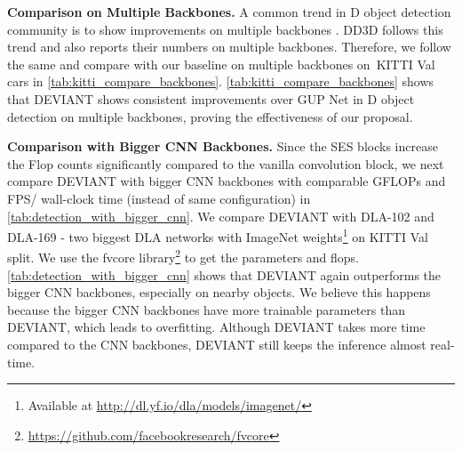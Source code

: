 \documentclass[runningheads]{llncs}
\newcommand{\twoD}{D}
\newcommand{\threeD}{D}
\newcommand{\dlaOneZeroTwo}{DLA-102}
\newcommand{\dlaOneSixNine}{DLA-169}
\newcommand{\kitti}{KITTI}
\newcommand{\imageNet}{ImageNet}
\newcommand{\valOne}{Val}
\newcommand{\gupNet}{GUP Net}
\newcommand{\ddThreeD}{DD3D}
\newcommand{\noIndentHeading}[1]{\noindent\textbf{#1}}
\newcommand{\methodName}{DEVIANT}
\begin{document}
\noIndentHeading{Comparison on Multiple Backbones.}
            A common trend in \twoD{} object detection community is to show improvements on multiple backbones \cite{wang2020scale}. 
            \ddThreeD \cite{park2021pseudo} follows this trend and also reports their numbers on multiple backbones.
            Therefore, we follow the same and compare with our baseline on multiple backbones on~\kitti{} \valOne{} cars in \cref{tab:kitti_compare_backbones}.
            \cref{tab:kitti_compare_backbones} shows that \methodName{} shows consistent improvements over \gupNet{} \cite{lu2021geometry} in \threeD{} object detection on multiple backbones, proving the effectiveness of our proposal.
               
\noIndentHeading{Comparison with Bigger CNN Backbones.}
            Since the SES blocks increase the Flop counts significantly compared to the vanilla convolution block, we next compare \methodName{} with bigger CNN backbones with comparable GFLOPs and FPS/ wall-clock time (instead of same configuration) in \cref{tab:detection_with_bigger_cnn}.
            We compare \methodName{} with \dlaOneZeroTwo{} and \dlaOneSixNine{} - two biggest DLA networks with \imageNet{} weights\footnote{Available at \url{http://dl.yf.io/dla/models/imagenet/}} on \kitti{} \valOne{} split. 
            We use the fvcore library\footnote{\url{https://github.com/facebookresearch/fvcore}} to get the parameters and flops.
            \cref{tab:detection_with_bigger_cnn} shows that \methodName{} again outperforms the bigger CNN backbones, especially on nearby objects. 
            We believe this happens because the bigger CNN backbones have more trainable parameters than \methodName{}, which leads to overfitting.
            Although \methodName{} takes more time compared to the CNN backbones, \methodName{} still keeps the inference almost real-time.
            
\end{document}
